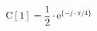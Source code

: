 \begin{center}
\[
\textrm{C}[1] = \frac{1}{2} \cdot \textrm{e}^{\{ -j \cdot \pi/4 \}}
\]
\end{center}
